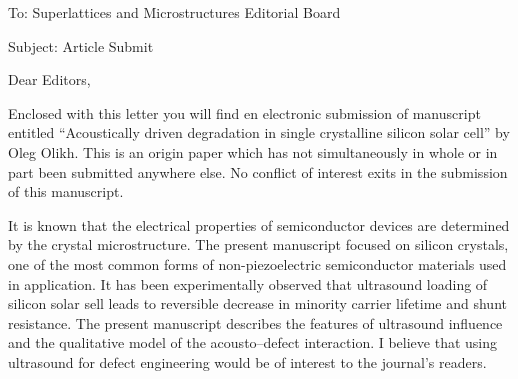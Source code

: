 \documentclass[preprint]{elsarticle}
\begin{document}
To:
Superlattices and Microstructures Editorial Board


Subject:
Article Submit

\vspace{5mm}
Dear Editors,

\vspace{3mm}
Enclosed with this letter you will find en electronic submission of manuscript entitled ``Acoustically driven degradation in single crystalline silicon solar cell'' by Oleg Olikh.
This is an origin paper which has not
simultaneously in whole or in part been submitted anywhere else.
No conflict of interest exits in the submission of this manuscript.

It is known that the electrical properties of semiconductor devices are determined by the crystal microstructure.
The present manuscript focused on silicon crystals, one of the most common forms of non-piezoelectric semiconductor materials used in application.
It has been experimentally observed that ultrasound loading of silicon solar sell leads to reversible decrease in minority carrier lifetime and shunt resistance. 
The present manuscript describes the features of ultrasound influence and the qualitative model of the acousto--defect interaction.
I believe that using ultrasound for defect engineering would be of interest to the journal’s readers.




\end{document}
